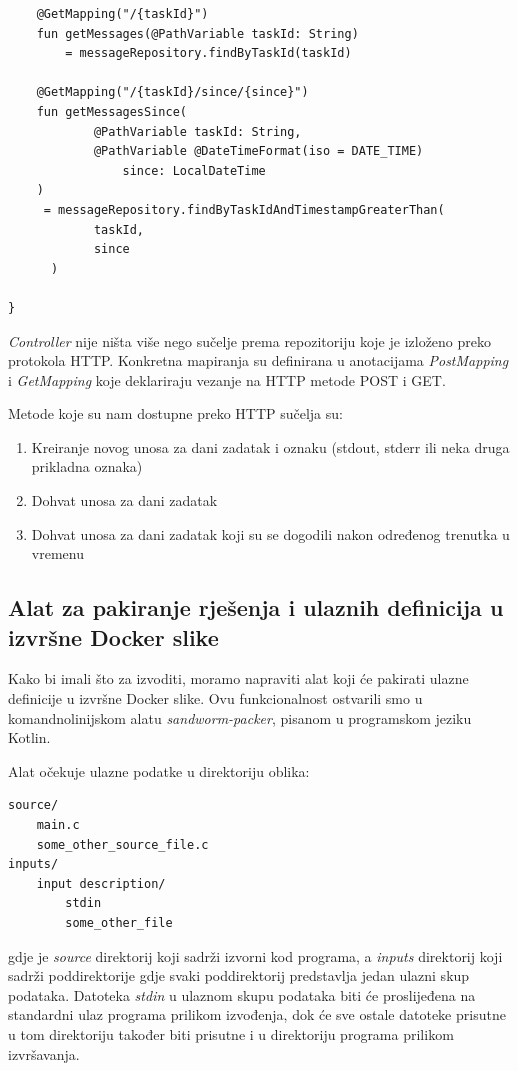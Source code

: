 \documentclass[times, utf8, zavrsni]{fer}
\begin{document}
{\begin{lstlisting}
    @GetMapping("/{taskId}")
    fun getMessages(@PathVariable taskId: String)
	 	= messageRepository.findByTaskId(taskId)

    @GetMapping("/{taskId}/since/{since}")
    fun getMessagesSince(
            @PathVariable taskId: String,
            @PathVariable @DateTimeFormat(iso = DATE_TIME)
				since: LocalDateTime
    )
     = messageRepository.findByTaskIdAndTimestampGreaterThan(
	  		taskId,
			since
	  )

}
\end{lstlisting}

{\textit{Controller}} nije ništa više nego sučelje prema repozitoriju koje je izloženo preko protokola HTTP. Konkretna mapiranja su definirana u anotacijama {\textit{PostMapping}} i {\textit{GetMapping}} koje deklariraju vezanje na HTTP metode POST i GET.

\hfill
\break

Metode koje su nam dostupne preko HTTP sučelja su:

\begin{enumerate}
\item Kreiranje novog unosa za dani zadatak i oznaku (stdout, stderr ili neka druga prikladna oznaka)
\item Dohvat unosa za dani zadatak
\item Dohvat unosa za dani zadatak koji su se dogodili nakon određenog trenutka u vremenu
\end{enumerate}

\subsection{Alat za pakiranje rješenja i ulaznih definicija u izvršne Docker slike}

Kako bi imali što za izvoditi, moramo napraviti alat koji će pakirati ulazne definicije u izvršne Docker slike. Ovu funkcionalnost ostvarili smo u komandnolinijskom alatu {\textit{sandworm-packer}}, pisanom u programskom jeziku Kotlin.

Alat očekuje ulazne podatke u direktoriju oblika:

\begin{lstlisting}
source/
    main.c
    some_other_source_file.c
inputs/
    input description/
        stdin
        some_other_file
\end{lstlisting}

gdje je {\textit{source}} direktorij koji sadrži izvorni kod programa, a {\textit{inputs}} direktorij koji sadrži poddirektorije gdje svaki poddirektorij predstavlja jedan ulazni skup podataka. Datoteka {\textit{stdin}} u ulaznom skupu podataka biti će proslijeđena na standardni ulaz programa prilikom izvođenja, dok će sve ostale datoteke prisutne u tom direktoriju također biti prisutne i u direktoriju programa prilikom izvršavanja.

}
\end{document}

